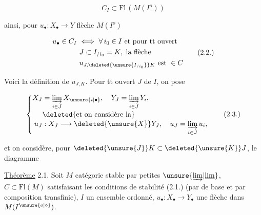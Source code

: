 \[
 C_I\subset\mathrm{Fl}\,(M(I^o))
\]

ainsi, pour $u_\bullet:X_\bullet\longrightarrow Y$ flèche  $M(I^o)$

\[
\begin{aligned}
 u_\bullet\in C_I\ &\Longleftrightarrow\ \forall\,i_0\in I\ \text{et pour tt ouvert}\\
 &J\subset I_{/i_0}=K,\ \text{la flèche}\\
 &u_{J,\deleted{\unsure{I_{/i_0}}}K}\ \text{est}\ \in C
\end{aligned}\tag*{(2.2.)}
\]

Voici la définition de $u_{J,K}$. Pour tt ouvert $J$ de $I$, on pose

\[
\left\{\begin{aligned}
 X_J&=\underset{i\in J}{\underrightarrow{\lim}}\,X_{\unsure{i|\bullet}},\quad
 Y_J=\underset{i\in J}{\underrightarrow{\lim}}\,Y_i,\\[-2pt]
 &\deleted{\text{et on considère la}}\\[-2pt]
 u_J&:X_J\longrightarrow \deleted{\unsure{X}}Y_J,\quad
 u_J=\underset{i\in J}{\underrightarrow{\lim}}\,u_i,
\end{aligned}\right.\tag*{(2.3.)}
\]

et on considère, pour $\deleted{\unsure{J}}K\subset\deleted{\unsure{K}}J$, le diagramme




\uline{Théorème} 2.1. Soit $M$ catégorie stable par petites $\unsure{\underrightarrow{\lim}|\underline{\lim}}$, $C\subset\mathrm{Fl}(M)$ satisfaisant les conditions de stabilité (2.1.) (par  de base et par composition transfinie), $I$ un  ensemble ordonné, $u_\bullet:X_\bullet\longrightarrow Y_\bullet$ une flèche dans $M(I^{\unsure{o|\circ}})$. 

